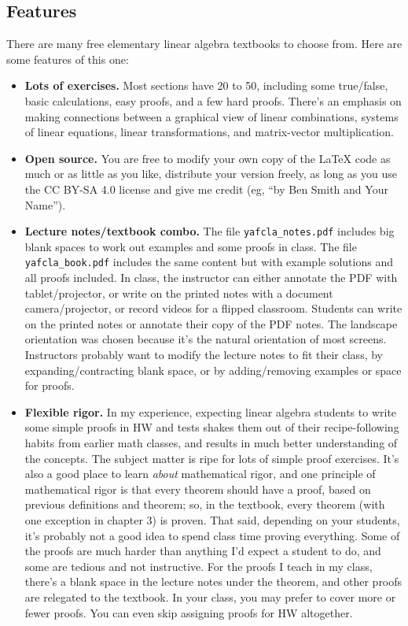 \documentclass[11pt, letterpaper]{report}
\newcounter{exercise}[section]
\newcounter{example}[section]
\newcounter{theorem}[chapter]
\begin{document}
\subsection{Features}
There are many free elementary linear algebra textbooks to choose from. Here are some features of this one:
\begin{itemize}
\item \textbf{Lots of exercises.} Most sections have 20 to 50, including some true/false, basic calculations, easy proofs, and a few hard proofs. There's an emphasis on making connections between a graphical view of linear combinations, systems of linear equations, linear transformations, and matrix-vector multiplication.
\item \textbf{Open source.} You are free to modify your own copy of the \LaTeX{} code as much or as little as you like, distribute your version freely, as long as you use the CC BY-SA 4.0 license and give me credit (eg, ``by Ben Smith and Your Name'').
\item \textbf{Lecture notes/textbook combo.} The file \texttt{yafcla\_notes.pdf} includes big blank spaces to work out examples and some proofs in class. The file \texttt{yafcla\_book.pdf} includes the same content but with example solutions and all proofs included. In class, the instructor can either annotate the PDF with tablet/projector, or write on the printed notes with a document camera/projector, or record videos for a flipped classroom. Students can write on the printed notes or annotate their copy of the PDF notes. The landscape orientation was chosen because it's the natural orientation of most screens. Instructors probably want to modify the lecture notes to fit their class, by expanding/contracting blank space, or by adding/removing examples or space for proofs.
\item \textbf{Flexible rigor.}  In my experience, expecting linear algebra students to write some simple proofs in HW and tests shakes them out of their recipe-following habits from earlier math classes, and results in much better understanding of the concepts. The subject matter is ripe for lots of simple proof exercises. It's also a good place to learn \emph{about} mathematical rigor, and one principle of mathematical rigor is that every theorem should have a proof, based on previous definitions and theorem; so, in the textbook, every theorem (with one exception in chapter 3) is proven. That said, depending on your students, it's probably not a good idea to spend class time proving everything. Some of the proofs are much harder than anything I'd expect a student to do, and some are tedious and not instructive. For the proofs I teach in my class, there's a blank space in the lecture notes under the theorem, and other proofs are relegated to the textbook. In your class, you may prefer to cover more or fewer proofs. You can even skip assigning proofs for HW altogether. 

\end{itemize}
\end{document}
